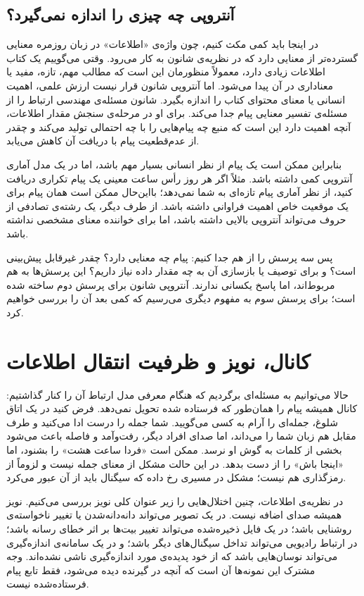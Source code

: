 \subsection{آنتروپی چه چیزی را اندازه نمی‌گیرد؟}
\label{sub:entropy-does-not-measure}

در اینجا باید کمی مکث کنیم، چون واژه‌ی «اطلاعات» در زبان روزمره معنایی گسترده‌تر از معنایی دارد که در نظریه‌ی شانون به کار می‌رود. وقتی می‌گوییم یک کتاب اطلاعات زیادی دارد، معمولاً منظورمان این است که مطالب مهم، تازه، مفید یا معناداری در آن پیدا می‌شود. اما آنتروپی شانون قرار نیست ارزش علمی، اهمیت انسانی یا معنای محتوای کتاب را اندازه بگیرد. شانون مسئله‌ی مهندسی ارتباط را از مسئله‌ی تفسیر معنایی پیام جدا می‌کند. برای او در مرحله‌ی سنجش مقدار اطلاعات، آنچه اهمیت دارد این است که منبع چه پیام‌هایی را با چه احتمالی تولید می‌کند و چقدر از عدم‌قطعیت پیام با دریافت آن کاهش می‌یابد. \autocite{shannon1948}

بنابراین ممکن است یک پیام از نظر انسانی بسیار مهم باشد، اما در یک مدل آماری آنتروپی کمی داشته باشد. مثلاً اگر هر روز رأس ساعت معینی یک پیام تکراری دریافت کنید، از نظر آماری پیام تازه‌ای به شما نمی‌دهد؛ بااین‌حال ممکن است همان پیام برای یک موقعیت خاص اهمیت فراوانی داشته باشد. از طرف دیگر، یک رشته‌ی تصادفی از حروف می‌تواند آنتروپی بالایی داشته باشد، اما برای خواننده معنای مشخصی نداشته باشد.

پس سه پرسش را از هم جدا کنیم: پیام چه معنایی دارد؟ چقدر غیرقابل پیش‌بینی است؟ و برای توصیف یا بازسازی آن به چه مقدار داده نیاز داریم؟ این پرسش‌ها به هم مربوط‌اند، اما پاسخ یکسانی ندارند. آنتروپی شانون برای پرسش دوم ساخته شده است؛ برای پرسش سوم به مفهوم دیگری می‌رسیم که کمی بعد آن را بررسی خواهیم کرد.

\section{کانال، نویز و ظرفیت انتقال اطلاعات}
\label{sec:channel-noise-capacity}

حالا می‌توانیم به مسئله‌ای برگردیم که هنگام معرفی مدل ارتباط آن را کنار گذاشتیم: کانال همیشه پیام را همان‌طور که فرستاده شده تحویل نمی‌دهد. فرض کنید در یک اتاق شلوغ، جمله‌ای را آرام به کسی می‌گویید. شما جمله را درست ادا می‌کنید و طرف مقابل هم زبان شما را می‌داند، اما صدای افراد دیگر، رفت‌وآمد و فاصله باعث می‌شود بخشی از کلمات به گوش او نرسد. ممکن است «فردا ساعت هشت» را بشنود، اما «اینجا باش» را از دست بدهد. در این حالت مشکل از معنای جمله نیست و لزوماً از رمزگذاری هم نیست؛ مشکل در مسیری رخ داده که سیگنال باید از آن عبور می‌کرد.

در نظریه‌ی اطلاعات، چنین اختلال‌هایی را زیر عنوان کلی نویز بررسی می‌کنیم. نویز همیشه صدای اضافه نیست. در یک تصویر می‌تواند دانه‌دانه‌شدن یا تغییر ناخواسته‌ی روشنایی باشد؛ در یک فایل ذخیره‌شده می‌تواند تغییر بیت‌ها بر اثر خطای رسانه باشد؛ در ارتباط رادیویی می‌تواند تداخل سیگنال‌های دیگر باشد؛ و در یک سامانه‌ی اندازه‌گیری می‌تواند نوسان‌هایی باشد که از خود پدیده‌ی مورد اندازه‌گیری ناشی نشده‌اند. وجه مشترک این نمونه‌ها آن است که آنچه در گیرنده دیده می‌شود، فقط تابع پیام فرستاده‌شده نیست.

